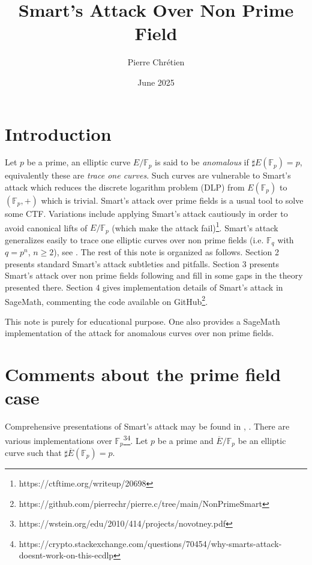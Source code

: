 \documentclass[10pt]{article}
\theoremstyle{definition}
\newcommand{\F}{\mathbb{F}}
\begin{document}

\author{Pierre Chrétien}
\title{Smart's Attack Over Non Prime Field}
\date{June 2025}
\maketitle


\section{Introduction}


Let $p$ be a prime, an elliptic curve $E/\F_p$ is said to be \textsl{anomalous} if $\sharp E(\F_p) = p$, equivalently these are \textsl{trace one curves}.
Such curves are vulnerable to Smart's attack  \cite{Sma99} which reduces the discrete logarithm problem (DLP) from $E(\F_p)$ to $(\F_p , +)$ which is trivial.
Smart's attack over prime fields is a usual tool to solve some CTF.
Variations include applying Smart's attack cautiously in order to avoid canonical lifts of $E/\F_p$ (which make the attack fail)\footnote{https://ctftime.org/writeup/20698}.
Smart's attack generalizes easily to trace one elliptic curves over non prime fields (i.e. $\F_q$ with $q = p^n$, $n \geq 2$), see \cite{Hofman}.
The rest of this note is organized as follows.
Section 2 presents standard Smart's attack subtleties and pitfalls.
Section 3 presents Smart's attack over non prime fields following \cite{Hofman} and fill in some gaps in the theory presented there.
Section 4 gives implementation details of Smart's attack in SageMath, commenting the code available on GitHub\footnote{https://github.com/pierrechr/pierre.c/tree/main/NonPrimeSmart}.

This note is purely for educational purpose.
One also provides a SageMath implementation of the attack for anomalous curves over non prime fields.
\section{Comments about the prime field case}

Comprehensive presentations of Smart's attack may be found in \cite{Hofman}, \cite{LEPREVOST2005225}. 
There are various implementations over $\F_p$\footnote{https://wstein.org/edu/2010/414/projects/novotney.pdf}\footnote{https://crypto.stackexchange.com/questions/70454/why-smarts-attack-doesnt-work-on-this-ecdlp}.
Let $p$ be a prime and $\overline{E}/\F_p$ be an elliptic curve such that $\sharp \overline{E}(\F_p) = p$.
\end{document}
